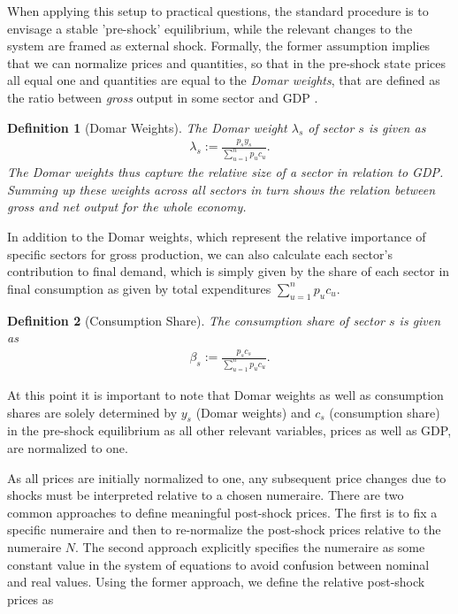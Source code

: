 \documentclass{article}
\newtheorem{definition}{Definition}
\begin{document}
When applying this setup  to practical questions, the standard procedure is to envisage a stable 'pre-shock' equilibrium, while the relevant changes to the system are framed as external shock. Formally, the former assumption implies that we can normalize prices and quantities, so that in the pre-shock state prices all equal one and quantities are equal to the \textit{Domar weights}, that are defined as the ratio between \textit{gross} output in some sector and GDP \citep[see][]{Hulten.1978}.

\begin{definition}[Domar Weights]
  The Domar weight $\lambda_s$ of sector $s$ is given as 
  \begin{align}
    \lambda_s := \frac{p_s y_s}{\sum_{u=1}^n p_u c_u}.
  \end{align}
The Domar weights thus capture the relative size of a sector in relation to GDP. Summing up these weights across all sectors in turn shows the relation between gross and net output for the whole economy.
\end{definition}

In addition to the Domar weights, which represent the relative importance of specific sectors for gross production, we can also calculate each sector's contribution to final demand, which is simply given by the share of each sector in final consumption as given by total expenditures $\sum_{u=1}^n p_u c_u$.

\begin{definition}[Consumption Share]
  The consumption share of sector $s$ is given as 
  \begin{align}
    \beta_s := \frac{p_s c_s}{\sum_{u=1}^n p_u c_u}.
  \end{align}
\end{definition}

At this point it is important to note that Domar weights as well as consumption shares are solely determined by $y_s$ (Domar weights) and $c_s$ (consumption share) in the pre-shock equilibrium as all other relevant variables, prices as well as GDP, are normalized to one. 

As all prices are initially normalized to one, any subsequent price changes due to shocks must be interpreted relative to a chosen numeraire. There are two common approaches to define meaningful post-shock prices. The first is to fix a specific numeraire and then to re-normalize the post-shock prices relative to the numeraire $N$. The second approach explicitly specifies the numeraire as some constant value in the system of equations to avoid confusion between nominal and real values. Using the former approach, we define the relative post-shock prices as
\end{document}

